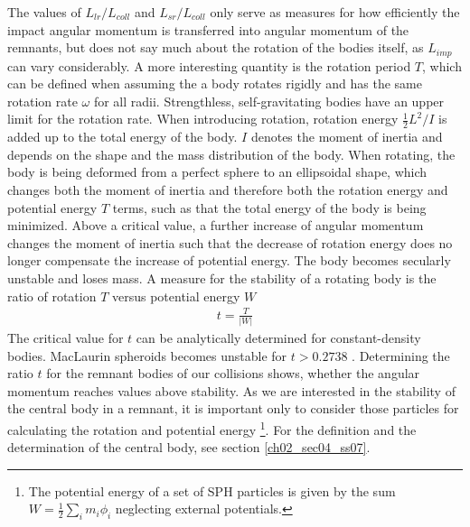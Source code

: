 The values of $L_{lr} / L_{coll}$ and $L_{sr} / L_{coll}$ only serve as measures for how efficiently the impact angular momentum is transferred into angular momentum of the remnants, but does not say much about the rotation of the bodies itself, as $L_{imp}$ can vary considerably. A more interesting quantity is the rotation period $T$, which can be defined when assuming the a body rotates rigidly and has the same rotation rate $\omega$ for all radii. Strengthless, self-gravitating bodies have an upper limit for the rotation rate. When introducing rotation, rotation energy $\frac{1}{2} L^2 / I$ is added up to the total energy of the body. $I$ denotes the moment of inertia and depends on the shape and the mass distribution of the body. When rotating, the body is being deformed from a perfect sphere to an ellipsoidal shape, which changes both the moment of inertia and therefore both the rotation energy and potential energy $T$ terms, such as that the total energy of the body is being minimized. Above a critical value, a further increase of angular momentum changes the moment of inertia such that the decrease of rotation energy does no longer compensate the increase of potential energy. The body becomes secularly unstable and loses mass. A measure for the stability of a rotating body is the ratio of rotation $T$ versus potential energy $W$
\begin{align}
t = \frac{T}{|W|}
\end{align}
The critical value for $t$ can be analytically determined for constant-density bodies. MacLaurin spheroids becomes unstable for $t > 0.2738$ \citep{chandrasekhar1969ellipsoidal, 1987gady.book.....B}. Determining the ratio $t$ for the remnant bodies of our collisions shows, whether the angular momentum reaches values above stability. As we are interested in the stability of the central body in a remnant, it is important only to consider those particles for calculating the rotation and potential energy \footnote{The potential energy of a set of SPH particles is given by the sum $W = \frac{1}{2} \sum_{i} m_i \phi_i$ neglecting external potentials.}. For the definition and the determination of the central body, see section \ref{ch02_sec04_ss07}.


